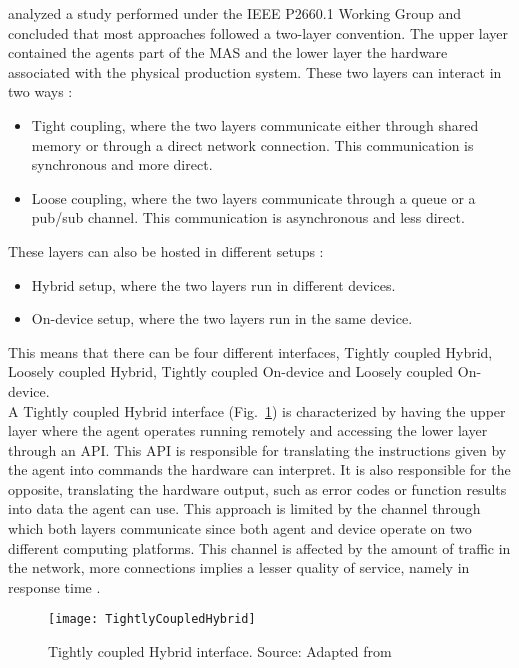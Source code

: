 \citeauthor{8591641} \cite{8591641} analyzed a study performed under the IEEE P2660.1 Working Group \cite{9340089} and concluded that most approaches followed a two-layer convention. The upper layer contained the agents part of the \acrshort{MAS} and the lower layer the hardware associated with the physical production system. These two layers can interact in two ways \cite{8591641}:
\begin{itemize}
	\itemsep0em
	\item Tight coupling, where the two layers communicate either through shared memory or through a direct network connection. This communication is synchronous and more direct.
	\item Loose coupling, where the two layers communicate through a queue or a pub/sub channel. This communication is asynchronous and less direct.
\end{itemize}

These layers can also be hosted in different setups \cite{8591641}:
\begin{itemize}
	\itemsep0em
	\item Hybrid setup, where the two layers run in different devices.
	\item On-device setup, where the two layers run in the same device. 
\end{itemize}

This means that there can be four different interfaces, Tightly coupled Hybrid, Loosely coupled Hybrid, Tightly coupled On-device and Loosely coupled On-device.\\

A Tightly coupled Hybrid interface (Fig.~\ref{fig:tightly_coupled_hybrid}) is characterized by having the upper layer where the agent operates running remotely and accessing the lower layer through an \acrshort{API}. This \acrshort{API} is responsible for translating the instructions given by the agent into commands the hardware can interpret. It is also responsible for the opposite, translating the hardware output, such as error codes or function results into data the agent can use. This approach is limited by the channel through which both layers communicate since both agent and device operate on two different computing platforms. This channel is affected by the amount of traffic in the network, more connections implies a lesser quality of service, namely in response time \cite{8591641}.\\

\begin{figure}[H]
	\centering
	\texttt{[image: TightlyCoupledHybrid]}
	\caption{Tightly coupled Hybrid interface. Source: Adapted from \cite{8591641}}
	\label{fig:tightly_coupled_hybrid}
\end{figure}

